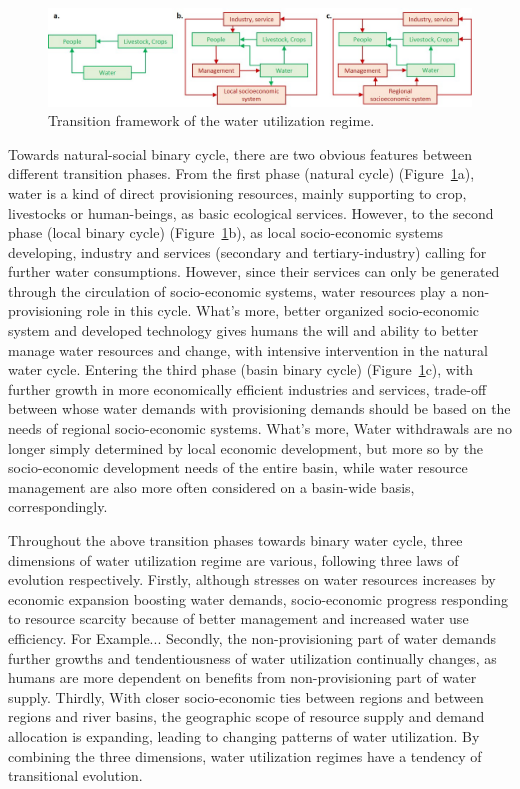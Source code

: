 \documentclass[9pt, twocolumn, twoside, lineno]{pnas-new}
\begin{document}
\begin{figure}%
	\centering
	\includegraphics[width=\linewidth]{../../figures/main_text/framework}
	\caption{Transition framework of the water utilization regime.}
	\label{fig:framework}
\end{figure}


Towards natural-social binary cycle, there are two obvious features between different transition phases.
From the first phase (natural cycle) (Figure~\ref{fig:framework}a), 
water is a kind of direct provisioning resources, mainly supporting to crop, livestocks or human-beings, 
as basic ecological services.
However, to the second phase (local binary cycle) (Figure~\ref{fig:framework}b), 
as local socio-economic systems developing, 
industry and services (secondary and tertiary-industry) calling for further water consumptions.
However, since their services can only be generated through the circulation of socio-economic systems, 
water resources play a non-provisioning role in this cycle. 
What's more, better organized socio-economic system and developed technology 
gives humans the will and ability to better manage water resources and change, 
with intensive intervention in the natural water cycle. 
Entering the third phase (basin binary cycle) (Figure~\ref{fig:framework}c), 
with further growth in more economically efficient industries and services, 
trade-off between whose water demands with provisioning demands 
should be based on the needs of regional socio-economic systems.
What's more, Water withdrawals are no longer simply determined by local economic development, 
but more so by the socio-economic development needs of the entire basin, 
while water resource management are also more often considered on a basin-wide basis, correspondingly. 


Throughout the above transition phases towards binary water cycle, 
three dimensions of water utilization regime are various, following three laws of evolution respectively.
Firstly, although stresses on water resources increases by economic expansion boosting water demands, 
socio-economic progress responding to resource scarcity because of better management and increased water use efficiency. 
For Example...
Secondly, the non-provisioning part of water demands further growths and 
tendentiousness of water utilization continually changes, 
as humans are more dependent on benefits from non-provisioning part of water supply.
Thirdly, With closer socio-economic ties between regions and between regions and river basins, 
the geographic scope of resource supply and demand allocation is expanding, 
leading to changing patterns of water utilization.
By combining the three dimensions, water utilization regimes have a tendency of transitional evolution.
\end{document}
